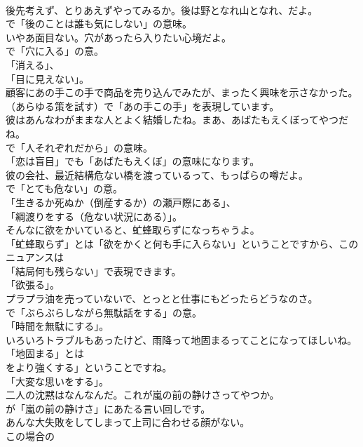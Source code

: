 \documentclass[8pt]{extreport}
\begin{document}
\begin{CJK}{UTF8}{min}
\\	後先考えず、とりあえずやってみるか。後は野となれ山となれ、だよ。 
\\	で「後のことは誰も気にしない」の意味。	
\\	いやあ面目ない。穴があったら入りたい心境だよ。 
\\	で「穴に入る」の意。
\\	「消える」、
\\	「目に見えない」。	
\\	顧客にあの手この手で商品を売り込んでみたが、まったく興味を示さなかった。 
\\	（あらゆる策を試す）で「あの手この手」を表現しています。	
\\	彼はあんなわがままな人とよく結婚したね。まあ、あばたもえくぼってやつだね。 
\\	で「人それぞれだから」の意味。 
\\	「恋は盲目」でも「あばたもえくぼ」の意味になります。	
\\	彼の会社、最近結構危ない橋を渡っているって、もっぱらの噂だよ。 
\\	で「とても危ない」の意。
\\	「生きるか死ぬか（倒産するか）の瀬戸際にある」、
\\	「綱渡りをする（危ない状況にある）」。	
\\	そんなに欲をかいていると、虻蜂取らずになっちゃうよ。 
\\	「虻蜂取らず」とは「欲をかくと何も手に入らない」ということですから、このニュアンスは
\\	「結局何も残らない」で表現できます。
\\	「欲張る」。	
\\	プラプラ油を売っていないで、とっとと仕事にもどったらどうなのさ。 
\\	で「ぶらぶらしながら無駄話をする」の意。
\\	「時間を無駄にする」。	
\\	いろいろトラブルもあったけど、雨降って地固まるってことになってほしいね。 
\\	「地固まる」とは
\\	をより強くする」ということですね。
\\	「大変な思いをする」。	
\\	二人の沈黙はなんなんだ。これが嵐の前の静けさってやつか。 
\\	が「嵐の前の静けさ」にあたる言い回しです。	
\\	あんな大失敗をしてしまって上司に合わせる顔がない。 
\\	この場合の

\end{CJK}
\end{document}
